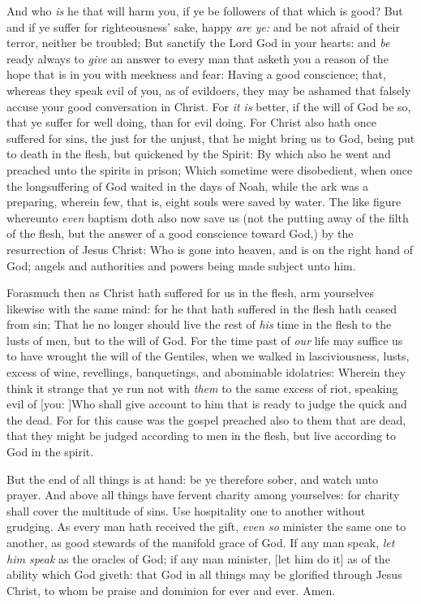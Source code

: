 \documentclass[11pt,letterpaper,oneside]{memoir}
\begin{document}
And who \emph{is} he that will harm you, if ye be followers of that
which is good? But and if ye suffer for righteousness' sake, happy
\emph{are ye:} and be not afraid of their terror, neither be troubled;
But sanctify the Lord God in your hearts: and \emph{be} ready always to
\emph{give} an answer to every man that asketh you a reason of the hope
that is in you with meekness and fear: Having a good conscience; that,
whereas they speak evil of you, as of evildoers, they may be ashamed
that falsely accuse your good conversation in Christ. For \emph{it is}
better, if the will of God be so, that ye suffer for well doing, than
for evil doing. For Christ also hath once suffered for sins, the just
for the unjust, that he might bring us to God, being put to death in the
flesh, but quickened by the Spirit: By which also he went and preached
unto the spirits in prison; Which sometime were disobedient, when once
the longsuffering of God waited in the days of Noah, while the ark was a
preparing, wherein few, that is, eight souls were saved by water. The
like figure whereunto \emph{even} baptism doth also now save us (not the
putting away of the filth of the flesh, but the answer of a good
conscience toward God,) by the resurrection of Jesus Christ: Who is gone
into heaven, and is on the right hand of God; angels and authorities and
powers being made subject unto him.

Forasmuch then as Christ hath suffered for us in the flesh, arm
yourselves likewise with the same mind: for he that hath suffered in the
flesh hath ceased from sin; That he no longer should live the rest of
\emph{his} time in the flesh to the lusts of men, but to the will of
God. For the time past of \emph{our} life may suffice us to have wrought
the will of the Gentiles, when we walked in lasciviousness, lusts,
excess of wine, revellings, banquetings, and abominable idolatries:
Wherein they think it strange that ye run not with \emph{them} to the
same excess of riot, speaking evil of [you: ]Who shall give account to
him that is ready to judge the quick and the dead. For for this cause
was the gospel preached also to them that are dead, that they might be
judged according to men in the flesh, but live according to God in the
spirit.

But the end of all things is at hand: be ye therefore sober, and watch
unto prayer. And above all things have fervent charity among yourselves:
for charity shall cover the multitude of sins. Use hospitality one to
another without grudging. As every man hath received the gift,
\emph{even so} minister the same one to another, as good stewards of the
manifold grace of God. If any man speak, \emph{let him speak} as the
oracles of God; if any man minister, [let him do it] as of the ability
which God giveth: that God in all things may be glorified through Jesus
Christ, to whom be praise and dominion for ever and ever. Amen.
\end{document}
